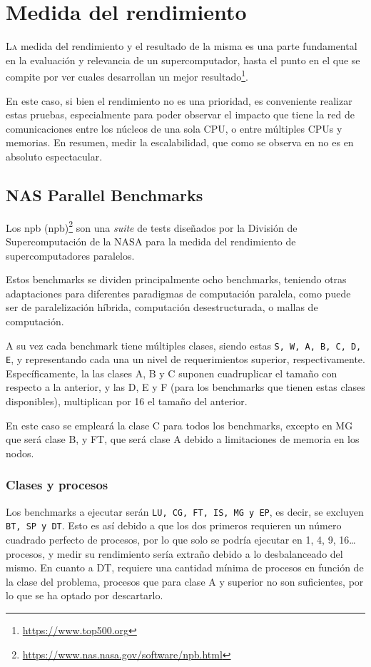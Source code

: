 \chapter{Medida del rendimiento}
\label{chap:medida_rendimiento}

\lettrine{L}{a} medida del rendimiento y el resultado de la misma es una parte fundamental en la evaluación y relevancia de un supercomputador, hasta el punto en el que se compite por ver cuales desarrollan un mejor resultado\footnote{\url{https://www.top500.org}}.

En este caso, si bien el rendimiento no es una prioridad, es conveniente realizar estas pruebas, especialmente para poder observar el impacto que tiene la red de comunicaciones entre los núcleos de una sola CPU, o entre múltiples CPUs y memorias. En resumen, medir la escalabilidad, que como se observa en  no es en absoluto espectacular.

\section{NAS Parallel Benchmarks}
Los \acrlong{npb} (\acrshort{npb})\footnote{\url{https://www.nas.nasa.gov/software/npb.html}} son una \textit{suite} de tests diseñados por la División de Supercomputación de la NASA para la medida del rendimiento de supercomputadores paralelos.

Estos benchmarks se dividen principalmente ocho benchmarks, teniendo otras adaptaciones para diferentes paradigmas de computación paralela, como puede ser de paralelización híbrida, computación desestructurada, o mallas de computación.

A su vez cada benchmark tiene múltiples clases, siendo estas \texttt{S, W, A, B, C, D, E}, y representando cada una un nivel de requerimientos superior, respectivamente. Específicamente, la las clases A, B y C suponen cuadruplicar el tamaño con respecto a la anterior, y las D, E y F (para los benchmarks que tienen estas clases disponibles), multiplican por 16 el tamaño del anterior.

En este caso se empleará la clase C para todos los benchmarks, excepto en MG que será clase B, y FT, que será clase A debido a limitaciones de memoria en los nodos.

\subsection{Clases y procesos}
Los benchmarks a ejecutar serán \texttt{LU, CG, FT, IS, MG y EP}, es decir, se excluyen \texttt{BT, SP y DT}. Esto es así debido a que los dos primeros requieren un número cuadrado perfecto de procesos, por lo que solo se podría ejecutar en 1, 4, 9, 16\dots procesos, y medir su rendimiento sería extraño debido a lo desbalanceado del mismo. En cuanto a DT, requiere una cantidad mínima de procesos en función de la clase del problema, procesos que para clase A y superior no son suficientes, por lo que se ha optado por descartarlo.

